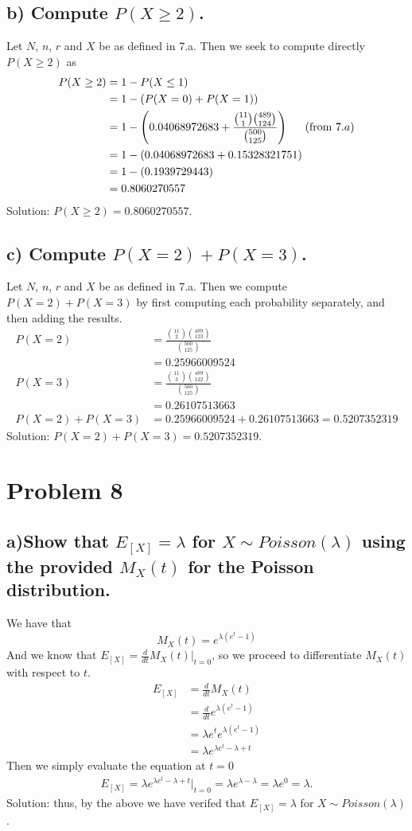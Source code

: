 \documentclass[11pt, letterpaper]{article}
\begin{document}
\subsection*{b) \normalfont Compute $P(X\geq 2)$.}
Let $N$, $n$, $r$ and $X$ be as defined in 7.a. Then we seek to compute directly $P(X\geq 2)$ as
\begin{align*}
    P(X\geq 2)&=1-P(X\leq 1)\\
    &=1-\left(P(X=0)+P(X=1)\right)\\
    &=1-\left(0.04068972683+\frac{{11 \choose 1}{489 \choose 124}}{{500 \choose 125}}\right) \text{\indent (from $7.a$)}\\
    &=1-\left(0.04068972683+0.15328321751\right)\\
    &=1-\left(0.1939729443\right)\\
    &=0.8060270557
\end{align*}
Solution: $P(X\geq 2)=0.8060270557$.
\subsection*{c) \normalfont Compute $P(X=2)+P(X=3)$.}
Let $N$, $n$, $r$ and $X$ be as defined in 7.a. Then we compute $P(X=2)+P(X=3)$ by first computing each probability separately,
and then adding the results.
\begin{align*}
    P(X=2)&=\frac{{11\choose 2}{489 \choose 123}}{{500 \choose 125}}\\
    &=0.25966009524\\
    P(X=3)&=\frac{{11\choose 3}{489\choose 122}}{{500\choose 125}}\\
    &=0.26107513663\\
    P(X=2)+P(X=3)&=0.25966009524+0.26107513663=0.5207352319
\end{align*}
Solution: $P(X=2)+P(X=3)=0.5207352319$.
\section*{Problem 8}
\subsection*{a)\normalfont Show that $E_{[X]}=\lambda$ for $X\sim Poisson(\lambda)$ using the provided $M_X(t)$ for the Poisson distribution.}
We have that
\[M_X(t)=e^{\lambda(e^t-1)}\]
And we know that $E_{[X]}=\frac{d}{dt}M_X(t)\bigg|_{t=0}$, so we proceed to differentiate $M_X(t)$ with respect to $t$.
\begin{align*}
    E_{[X]}&=\frac{d}{dt}M_X(t)\\
    &=\frac{d}{dt}e^{\lambda(e^t-1)}\\
    &=\lambda e^te^{\lambda(e^t-1)}\\
    &=\lambda e^{\lambda e^t-\lambda +t}
\end{align*}
Then we simply evaluate the equation at $t=0$
\begin{align*}
    E_{[X]}=\lambda e^{\lambda e^t-\lambda +t}\bigg|_{t=0}=\lambda e^{\lambda-\lambda}=\lambda e^0=\lambda.
\end{align*}
Solution: thus, by the above we have verifed that $E_{[X]}=\lambda$ for $X\sim Poisson(\lambda)$.
\end{document}
